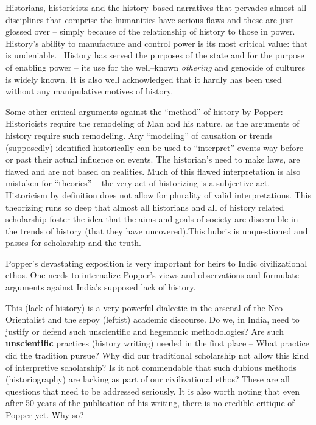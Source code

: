 Historians, historicists and the history–based narratives that pervades almost all disciplines that comprise the humanities have serious flaws and these are just glossed over – simply because of the relationship of history to those in power. History’s ability to manufacture and control power is its most critical value: that is undeniable.  History has served the purposes of the state and for the purpose of enabling power – its use for the well–known \textit{othering} and genocide of cultures is widely known. It is also well acknowledged that it hardly has been used without any manipulative motives of history.

Some other critical arguments against the “method” of history by Popper: Historicists require the remodeling of Man and his nature, as the arguments of history require such remodeling. Any “modeling” of causation or trends (supposedly) identified historically can be used to “interpret” events way before or past their actual influence on events. The historian’s need to make laws, are flawed and are not based on realities. Much of this flawed interpretation is also mistaken for “theories” – the very act of historizing is a subjective act. Historicism by definition does not allow for plurality of valid interpretations. This theorizing runs so deep that almost all historians and all of history related scholarship foster the idea that the aims and goals of society are discernible in the trends of history (that they have uncovered).This hubris is unquestioned and passes for scholarship and the truth.

Popper’s devastating exposition is very important for heirs to Indic civilizational ethos. One needs to internalize Popper’s views and observations and formulate arguments against India’s supposed lack of history.

This (lack of history) is a very powerful dialectic in the arsenal of the Neo–Orientalist and the sepoy (leftist) academic discourse. Do we, in India, need to justify or defend such unscientific and hegemonic methodologies? Are such \textbf{unscientific} practices (history writing) needed in the first place – What practice did the tradition pursue? Why did our traditional scholarship not allow this kind of interpretive scholarship? Is it not commendable that such dubious methods (historiography) are lacking as part of our civilizational ethos? These are all questions that need to be addressed seriously. It is also worth noting that even after 50 years of the publication of his writing, there is no credible critique of Popper yet. Why so?


